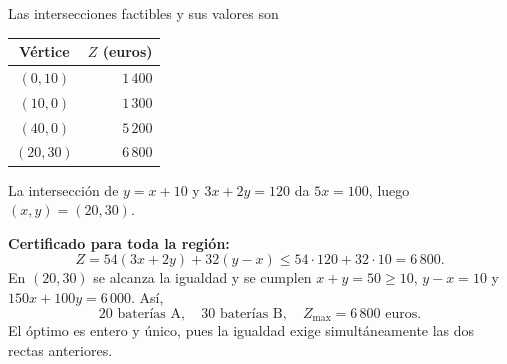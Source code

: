 \documentclass[11pt]{article}
\begin{document}
Las intersecciones factibles y sus valores son
\begin{center}
\begin{tabular}{c|r}
Vértice & $Z$ (euros)\\\hline
$(0,10)$ & $1\,400$\\
$(10,0)$ & $1\,300$\\
$(40,0)$ & $5\,200$\\
$(20,30)$ & $6\,800$
\end{tabular}
\end{center}
La intersección de $y=x+10$ y $3x+2y=120$ da $5x=100$, luego $(x,y)=(20,30)$.

\textbf{Certificado para toda la región:}
\[Z=54(3x+2y)+32(y-x)\leq54\cdot120+32\cdot10=6\,800.\]
En $(20,30)$ se alcanza la igualdad y se cumplen $x+y=50\geq10$, $y-x=10$ y $150x+100y=6\,000$. Así,
\[\boxed{20\text{ baterías A},\quad30\text{ baterías B},\quad Z_{\max}=6\,800\text{ euros}}.\]
El óptimo es entero y único, pues la igualdad exige simultáneamente las dos rectas anteriores.
\begin{center}
\end{center}
\end{document}
